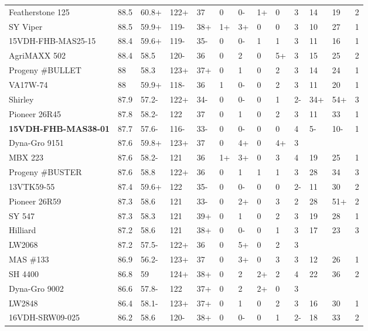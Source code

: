 \documentclass[12pt, letterpaper]{article}
\begin{document}
\begin{landscape}
\begin{ThreePartTable}
\begin{longtable}{lllllllllllll}
  Featherstone 125 & 88.5 & 60.8+ & 122+ & 37 & 0 & 0- & 1+ & 0 & 3 & 14 & 19 & 2 \\ 
  SY Viper & 88.5 & 59.9+ & 119- & 38+ & 1+ & 3+ & 0 & 0 & 3 & 10 & 27 & 1 \\ 
  15VDH-FHB-MAS25-15 & 88.4 & 59.6+ & 119- & 35- & 0 & 0- & 1 & 1 & 3 & 11 & 16 & 1 \\ 
  AgriMAXX 502 & 88.4 & 58.5 & 120- & 36 & 0 & 2 & 0 & 5+ & 3 & 15 & 25 & 2 \\ 
  Progeny \#BULLET & 88 & 58.3 & 123+ & 37+ & 0 & 1 & 0 & 2 & 3 & 14 & 24 & 1 \\ 
  VA17W-74 & 88 & 59.9+ & 118- & 36 & 1 & 0- & 0 & 2 & 3 & 11 & 20 & 1 \\ 
  Shirley & 87.9 & 57.2- & 122+ & 34- & 0 & 0- & 0 & 1 & 2- & 34+ & 54+ & 3 \\ 
  Pioneer 26R45 & 87.8 & 58.2- & 122 & 37 & 0 & 1 & 0 & 2 & 3 & 11 & 33 & 1 \\ 
  \textbf{15VDH-FHB-MAS38-01} & 87.7 & 57.6- & 116- & 33- & 0 & 0- & 0 & 0 & 4 & 5- & 10- & 1 \\ 
  Dyna-Gro 9151 & 87.6 & 59.8+ & 123+ & 37 & 0 & 4+ & 0 & 4+ & 3 &  &  &  \\ 
  MBX 223 & 87.6 & 58.2- & 121 & 36 & 1+ & 3+ & 0 & 3 & 4 & 19 & 25 & 1 \\ 
  Progeny \#BUSTER & 87.6 & 58.8 & 122+ & 36 & 0 & 1 & 1 & 1 & 3 & 28 & 34 & 3 \\ 
  13VTK59-55 & 87.4 & 59.6+ & 122 & 35- & 0 & 0- & 0 & 0 & 2- & 11 & 30 & 2 \\ 
  Pioneer 26R59 & 87.3 & 58.6 & 121 & 33- & 0 & 2+ & 0 & 3 & 2 & 28 & 51+ & 2 \\ 
  SY 547 & 87.3 & 58.3 & 121 & 39+ & 0 & 1 & 0 & 2 & 3 & 19 & 28 & 1 \\ 
  Hilliard & 87.2 & 58.6 & 121 & 38+ & 0 & 0- & 0 & 1 & 3 & 17 & 23 & 3 \\ 
  LW2068 & 87.2 & 57.5- & 122+ & 36 & 0 & 5+ & 0 & 2 & 3 &  &  &  \\ 
  MAS \#133 & 86.9 & 56.2- & 123+ & 37 & 0 & 3+ & 0 & 3 & 3 & 12 & 26 & 1 \\ 
  SH 4400 & 86.8 & 59 & 124+ & 38+ & 0 & 2 & 2+ & 2 & 4 & 22 & 36 & 2 \\ 
  Dyna-Gro 9002 & 86.6 & 57.8- & 122 & 37+ & 0 & 2 & 2+ & 0 & 3 &  &  &  \\ 
  LW2848 & 86.4 & 58.1- & 123+ & 37+ & 0 & 1 & 0 & 2 & 3 & 16 & 30 & 1 \\ 
  16VDH-SRW09-025 & 86.2 & 58.6 & 120- & 38+ & 0 & 0- & 0 & 1 & 2- & 18 & 33 & 2 \\ 

\end{longtable}
\end{ThreePartTable}
\end{landscape}
\end{document}
